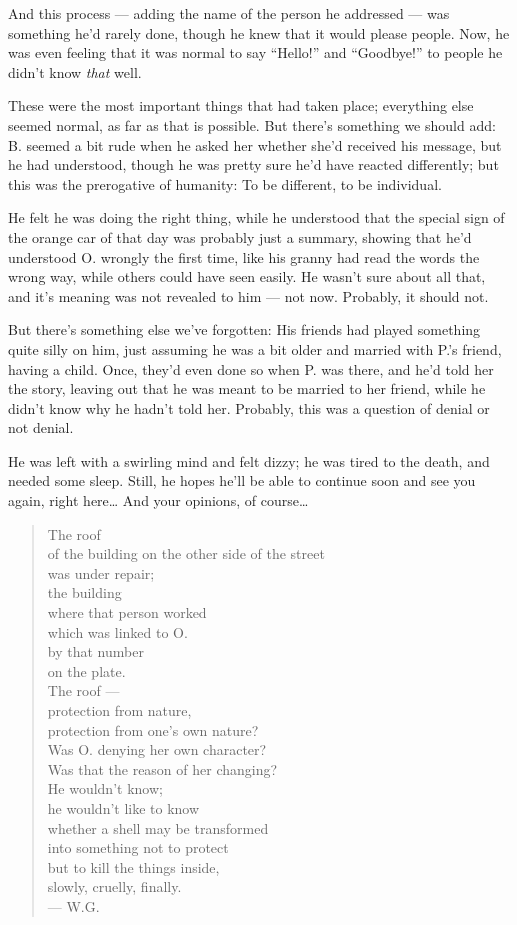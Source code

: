 And this process --- adding the name of the person he addressed --- was something he'd rarely done, though he knew that it would please people. Now, he was even feeling that it was normal to say \enquote{Hello!} and \enquote{Goodbye!} to people he didn't know \emph{that} well.

These were the most important things that had taken place; everything else seemed normal, as far as that is possible. But there's something we should add: B. seemed a bit rude when he asked her whether she'd received his message, but he had understood, though he was pretty sure he'd have reacted differently; but this was the prerogative of humanity: To be different, to be individual.

He felt he was doing the right thing, while he understood that the special sign of the orange car of that day was probably just a summary, showing that he'd understood O. wrongly the first time, like his granny had read the words the wrong way, while others could have seen easily. He wasn't sure about all that, and it's meaning was not revealed to him --- not now. Probably, it should not.

But there's something else we've forgotten: His friends had played something quite silly on him, just assuming he was a bit older and married with P.'s friend, having a child. Once, they'd even done so when P. was there, and he'd told her the story, leaving out that he was meant to be married to her friend, while he didn't know why he hadn't told her. Probably, this was a question of denial or not denial.

He was left with a swirling mind and felt dizzy; he was tired to the death, and needed some sleep. 
Still, he hopes he'll be able to continue soon and see you again, right here\ldots
And your opinions, of course\ldots

\begin{verse}
The roof \\
of the building on the other side of the street \\
was under repair; \\
the building \\
where that person worked \\
which was linked to O. \\
by that number \\
on the plate. \\
The roof --- \\
protection from nature, \\
protection from one's own nature? \\
Was O. denying her own character? \\
Was that the reason of her changing? \\
He wouldn't know; \\
he wouldn't like to know \\
whether a shell may be transformed \\
into something not to protect \\
but to kill the things inside, \\
slowly, cruelly, finally. \\
--- W.G.
\end{verse}

